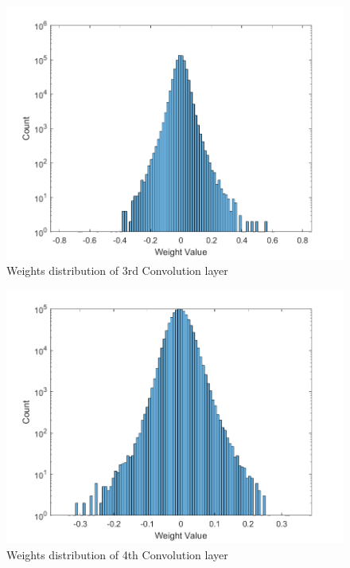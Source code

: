 \begin{figure} [H]
	\centering
	\includegraphics[scale=0.9]{Images/Weights-distributions/original/weight-distribution-conv3.png}
	\decoRule
	\caption[Weights distribution of 3rd Convolution layer]{Weights distribution of 3rd Convolution layer}
	\label{fig:weight-distribution-conv3}
\end{figure}

\begin{figure} [H]
	\centering
	\includegraphics[scale=0.9]{Images/Weights-distributions/original/weight-distribution-conv4.png}
	\decoRule
	\caption[Weights distribution of 4th Convolution layer]{Weights distribution of 4th Convolution layer}
	\label{fig:weight-distribution-conv4}
\end{figure}

